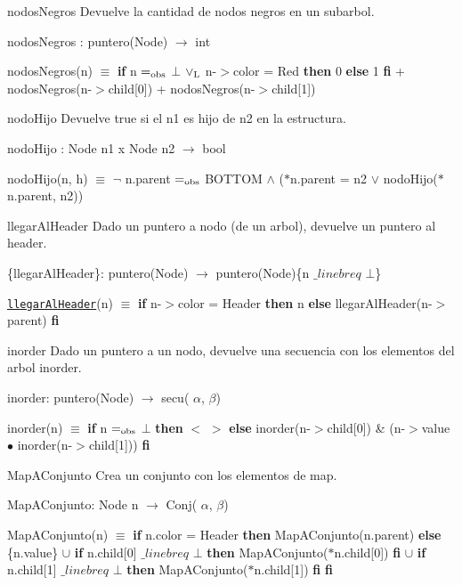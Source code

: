 \begin{DoxyParagraph}{nodos\-Negros}
\-Devuelve la cantidad de nodos negros en un subarbol.
\end{DoxyParagraph}
nodos\-Negros \-: puntero(\-Node) $\to$ int\par
 nodos\-Negros(n) $\equiv$ {\bfseries if} n $=_{\rm obs}$ $\bot$ $\lor_{\rm L}$ n-\/$>$color = \-Red {\bfseries then} 0 {\bfseries else} 1 {\bfseries fi} + nodos\-Negros(n-\/$>$child\mbox{[}0\mbox{]}) + nodos\-Negros(n-\/$>$child\mbox{[}1\mbox{]}) 

\begin{DoxyParagraph}{nodo\-Hijo}
\-Devuelve true si el n1 es hijo de n2 en la estructura.
\end{DoxyParagraph}
nodo\-Hijo \-: \-Node n1 x \-Node n2 $\to$ bool\par
 nodo\-Hijo(n, h) $\equiv$ $\lnot$ n.\-parent $=_{\rm obs}$ \-B\-O\-T\-T\-O\-M $\land$ ($\ast$n.parent = n2 $\lor$ nodo\-Hijo($\ast$n.parent, n2)) 

\begin{DoxyParagraph}{llegar\-Al\-Header}
\-Dado un puntero a nodo (de un arbol), devuelve un puntero al header.
\end{DoxyParagraph}
\{llegar\-Al\-Header\}\-: puntero(\-Node) $\to$ puntero(\-Node)\{n $\_linebr eq$ $\bot$\}\par
 \href{axiomas.html#llegarAlHeader}{\tt llegar\-Al\-Header}(n) $\equiv$ {\bfseries if} n-\/$>$color = \-Header {\bfseries then} n {\bfseries else} llegar\-Al\-Header(n-\/$>$parent) {\bfseries fi} 

\begin{DoxyParagraph}{inorder}
\-Dado un puntero a un nodo, devuelve una secuencia con los elementos del arbol inorder.
\end{DoxyParagraph}
inorder\-: puntero(\-Node) $\to$ secu( $\alpha$, $\beta$)\par
 inorder(n) $\equiv$ {\bfseries if} n $=_{\rm obs}$ $\bot$ {\bfseries then} $<$ $>$ {\bfseries else} inorder(n-\/$>$child\mbox{[}0\mbox{]}) \& (n-\/$>$value $\bullet$ inorder(n-\/$>$child\mbox{[}1\mbox{]})) {\bfseries fi} 

\begin{DoxyParagraph}{\-Map\-A\-Conjunto}
\-Crea un conjunto con los elementos de map.
\end{DoxyParagraph}
\-Map\-A\-Conjunto\-: \-Node n $\to$ \-Conj( $\alpha$, $\beta$)\par
 \-Map\-A\-Conjunto(n) $\equiv$ {\bfseries if} n.\-color = \-Header {\bfseries then} \-Map\-A\-Conjunto(n.\-parent) {\bfseries else} \{n.\-value\} $\cup$ {\bfseries if} n.\-child\mbox{[}0\mbox{]} $\_linebr eq$ $\bot$ {\bfseries then} \-Map\-A\-Conjunto($\ast$n.child\mbox{[}0\mbox{]}) {\bfseries fi} $\cup$ {\bfseries if} n.\-child\mbox{[}1\mbox{]} $\_linebr eq$ $\bot$ {\bfseries then} \-Map\-A\-Conjunto($\ast$n.child\mbox{[}1\mbox{]}) {\bfseries fi} {\bfseries fi} 

